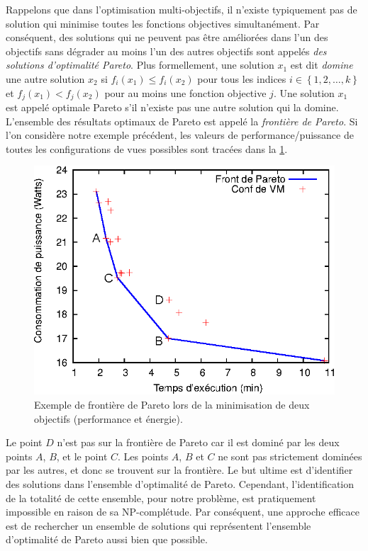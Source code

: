Rappelons que dans l'optimisation multi-objectifs, il n'existe typiquement pas de solution qui minimise toutes les fonctions objectives simultanément. Par conséquent, des solutions qui ne peuvent pas être améliorées dans l'un des objectifs sans dégrader au moins l'un des autres objectifs sont appelés \textit{des solutions d'optimalité Pareto}. Plus formellement, une solution $x_1$ est dit \textit {domine} une autre solution $x_2$ si $f_i(x_1)\leq f_i(x_2)$ pour tous les indices $i \in \left\{ {1,2,\dots,k } \right\}$ et $f_j(x_1) < f_j(x_2)$ pour au moins une fonction objective $j$.
Une solution $x_1$ est appelé optimale Pareto s'il n'existe pas une autre solution qui la domine. L'ensemble des résultats optimaux de Pareto est appelé la \textit{frontière de Pareto}.
Si l'on considère notre exemple précédent, les valeurs de performance/puissance de toutes les configurations de vues possibles sont tracées dans la \ref{fig:motiv-example}.
\begin{figure}
 \centering
 \includegraphics[scale=1.0]{chapitre6/chap6Fig/motiv-example.eps}
 \caption{Exemple de frontière de Pareto lors de la minimisation de deux objectifs (performance et énergie).}
 \label{fig:motiv-example}
\end{figure}
Le point $D$ n'est pas sur la frontière de Pareto car il est dominé par les deux points $A$, $B$, et le point $C$. Les points $A$, $B$ et $C$ ne sont pas strictement dominées par les autres, et donc se trouvent sur la frontière.
Le but ultime est d'identifier des solutions dans l'ensemble d'optimalité de Pareto. Cependant, l'identification de la totalité de cette ensemble, pour notre problème, est pratiquement impossible en raison de sa NP-complétude. Par conséquent, une approche efficace est de rechercher un ensemble de solutions qui représentent l'ensemble d'optimalité de Pareto aussi bien que possible.

